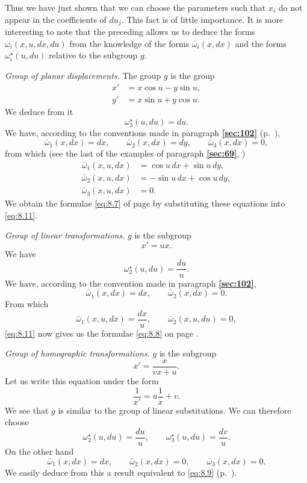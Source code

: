 \documentclass[leqno,11pt]{book}
\numberwithin{equation}{chapter}
\theoremstyle{shape1}
\theoremstyle{shapesmall}
\newcommand{\fsref}[1]{{\rm\textsection\textbf{\ref{sec:#1}}}}
\newcommand{\str}{^{\star}}
\newcommand{\somespace}{\vspace{9pt}}
\begin{document}
{Thus we have just shown that we can choose the parameters such that $x_{i}$ do not appear in the coefficients of $du_{j}$. This fact is of little importance. It is more interesting to note that the preceding allows us to deduce the forms $\omega_{i}(x,u,dx,du)$ from the knowledge of the forms $\bar\omega_{i}(x,dx)$ and the forms $\omega_{i}\str(u,du)$ relative to the subgroup $g$.

\somespace

\emph{Group of planar displacements.} The group $g$ is the group
\begin{align*}
  x'&=x\cos u-y\sin u,\\
  y'&=x\sin u+y\cos u.
\end{align*}
We deduce from it
\[
\omega_{3}\str(u,du)=du.
\]
We have, according to the conventions made in paragraph \fsref{102} (p.~\pageref{sec:102}),
\[
\bar\omega_{1}(x,dx)=dx,\qquad\bar\omega_{2}(x,dx)=dy,\qquad\bar\omega_{3}(x,dx)=0,
\]
from which (see the last of the examples of paragraph \fsref{69}, \pageref{sec:69})
\begin{align*}
  \bar\omega_{1}(x,u,dx)&=\cos u\,dx+\sin u\,dy,\\
  \bar\omega_{2}(x,u,dx)&=-\sin u\,dx+\cos u\,dy,\\
  \bar\omega_{3}(x,u,dx)&=0.
\end{align*}
We obtain the formulae \eqref{eq:8.7} of page \pageref{eq:8.7} by substituting these equations into \eqref{eq:8.11}.

\somespace

\emph{Group of linear transformations.} $g$ is the subgroup
\[x'=ux.\]
We have
\[
\omega\str_{2}(u,du)=\frac{du}{u}.
\]
We have, according to the convention made in paragraph \fsref{102},
\[
\bar\omega_{1}(x,dx)=dx,\qquad\bar\omega_{2}(x,dx)=0.
\]
From which
\[
\bar\omega_{1}(x,u,dx)=\frac{dx}{u},\qquad\bar\omega_{2}(x,u,du)=0,
\]
\eqref{eq:8.11} now gives us the formulae \eqref{eq:8.8} on page \pageref{eq:8.8}.

\somespace

\emph{Group of homographic transformations.} $g$ is the subgroup
\[
x'=\frac{x}{vx+u}.
\]
Let us write this equation under the form
\[
\frac{1}{x'}=u\frac{1}{x}+v.
\]
We see that $g$ is similar to the group of linear substitutions. We can therefore choose
\[
\omega\str_{2}(u,du)=\frac{du}{u},\qquad\omega_{3}\str(u,du)=\frac{dv}{u}.
\]
On the other hand
\[
\bar\omega_{1}(x,dx)=dx,\qquad\bar\omega_{2}(x,dx)=0,\qquad\bar\omega_{3}(x,dx)=0.
\]
We easily deduce from this a result equivalent to \eqref{eq:8.9} (p.~\pageref{eq:8.9}).

}
\end{document}

